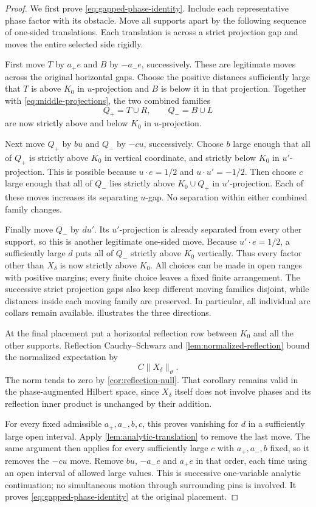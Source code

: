 \begin{proof}
We first prove \eqref{eq:gapped-phase-identity}.  Include each
representative phase factor with its obstacle.  Move all supports
apart by the following sequence of one-sided translations.  Each
translation is across a strict projection gap and moves the entire
selected side rigidly.

First move $T$ by $a_+e$ and $B$ by $-a_-e$, successively.
These are legitimate moves across the original horizontal gaps.
Choose the positive distances sufficiently large that $T$ is above
$K_0$ in $u$-projection and $B$ is below it in that projection.
Together with \eqref{eq:middle-projections}, the two combined
families
\[
 Q_+=T\cup R,\qquad Q_-=B\cup L
\]
are now strictly above and below $K_0$ in $u$-projection.

Next move $Q_+$ by $bu$ and $Q_-$ by $-cu$, successively.
Choose $b$ large enough that all of $Q_+$ is strictly above $K_0$
in vertical coordinate, and strictly below $K_0$ in $u'$-projection.
This is possible because $u\cdot e=1/2$ and
$u\cdot u'=-1/2$.  Then choose $c$ large enough that all of
$Q_-$ lies strictly above $K_0\cup Q_+$ in $u'$-projection.
Each of these moves increases its separating $u$-gap.  No
separation within either combined family changes.

Finally move $Q_-$ by $du'$.  Its $u'$-projection is already
separated from every other support, so this is another legitimate
one-sided move.  Because $u'\cdot e=1/2$, a sufficiently large
$d$ puts all of $Q_-$ strictly above $K_0$ vertically.  Thus every
factor other than $X_\delta$ is now strictly above $K_0$.
All choices can be made in open ranges with positive margins;
every finite choice leaves a fixed finite arrangement.  The
successive strict projection gaps also keep different moving
families disjoint, while distances inside each moving family are
preserved.  In particular, all individual arc collars remain
available.   illustrates the three directions.

At the final placement put a horizontal reflection row between
$K_0$ and all the other supports.  Reflection Cauchy--Schwarz and
\cref{lem:normalized-reflection} bound the normalized expectation
by
\[
 C\|X_\delta\|_{\vartheta}.
\]
The norm tends to zero by \cref{cor:reflection-null}.  That
corollary remains valid in the phase-augmented Hilbert space,
since $X_\delta$ itself does not involve phases and its reflection
inner product is unchanged by their addition.

For every fixed admissible $a_+,a_-,b,c$, this proves vanishing
for $d$ in a sufficiently large open interval.  Apply
\cref{lem:analytic-translation} to remove the last move.  The same
argument then applies for every sufficiently large $c$ with
$a_+,a_-,b$ fixed, so it removes the $-cu$ move.  Remove $bu$,
$-a_-e$ and $a_+e$ in that order, each time using an open interval
of allowed large values.  This is successive one-variable
analytic continuation; no simultaneous motion through surrounding
pins is involved.  It proves \eqref{eq:gapped-phase-identity} at
the original placement.


\end{proof}
